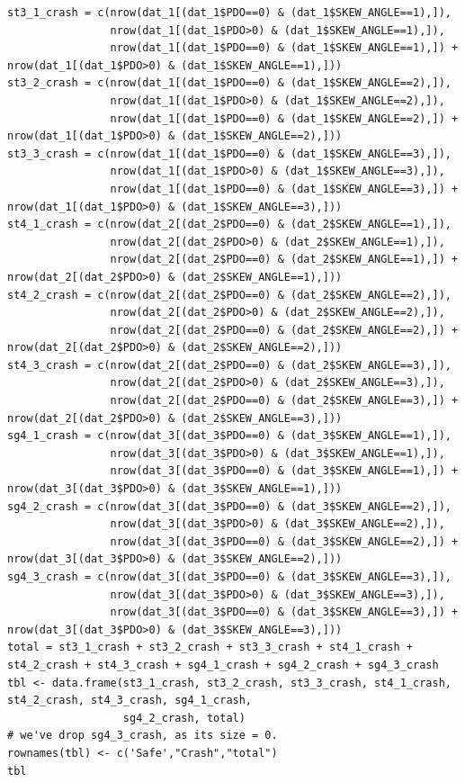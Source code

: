 \documentclass[11pt]{scrartcl} %
\begin{document}
\begin{lstlisting}
st3_1_crash = c(nrow(dat_1[(dat_1$PDO==0) & (dat_1$SKEW_ANGLE==1),]),
                nrow(dat_1[(dat_1$PDO>0) & (dat_1$SKEW_ANGLE==1),]),
                nrow(dat_1[(dat_1$PDO==0) & (dat_1$SKEW_ANGLE==1),]) + nrow(dat_1[(dat_1$PDO>0) & (dat_1$SKEW_ANGLE==1),]))
st3_2_crash = c(nrow(dat_1[(dat_1$PDO==0) & (dat_1$SKEW_ANGLE==2),]),
                nrow(dat_1[(dat_1$PDO>0) & (dat_1$SKEW_ANGLE==2),]),
                nrow(dat_1[(dat_1$PDO==0) & (dat_1$SKEW_ANGLE==2),]) + nrow(dat_1[(dat_1$PDO>0) & (dat_1$SKEW_ANGLE==2),]))
st3_3_crash = c(nrow(dat_1[(dat_1$PDO==0) & (dat_1$SKEW_ANGLE==3),]),
                nrow(dat_1[(dat_1$PDO>0) & (dat_1$SKEW_ANGLE==3),]),
                nrow(dat_1[(dat_1$PDO==0) & (dat_1$SKEW_ANGLE==3),]) + nrow(dat_1[(dat_1$PDO>0) & (dat_1$SKEW_ANGLE==3),]))
st4_1_crash = c(nrow(dat_2[(dat_2$PDO==0) & (dat_2$SKEW_ANGLE==1),]),
                nrow(dat_2[(dat_2$PDO>0) & (dat_2$SKEW_ANGLE==1),]),
                nrow(dat_2[(dat_2$PDO==0) & (dat_2$SKEW_ANGLE==1),]) + nrow(dat_2[(dat_2$PDO>0) & (dat_2$SKEW_ANGLE==1),]))
st4_2_crash = c(nrow(dat_2[(dat_2$PDO==0) & (dat_2$SKEW_ANGLE==2),]),
                nrow(dat_2[(dat_2$PDO>0) & (dat_2$SKEW_ANGLE==2),]),
                nrow(dat_2[(dat_2$PDO==0) & (dat_2$SKEW_ANGLE==2),]) + nrow(dat_2[(dat_2$PDO>0) & (dat_2$SKEW_ANGLE==2),]))
st4_3_crash = c(nrow(dat_2[(dat_2$PDO==0) & (dat_2$SKEW_ANGLE==3),]),
                nrow(dat_2[(dat_2$PDO>0) & (dat_2$SKEW_ANGLE==3),]),
                nrow(dat_2[(dat_2$PDO==0) & (dat_2$SKEW_ANGLE==3),]) + nrow(dat_2[(dat_2$PDO>0) & (dat_2$SKEW_ANGLE==3),]))
sg4_1_crash = c(nrow(dat_3[(dat_3$PDO==0) & (dat_3$SKEW_ANGLE==1),]),
                nrow(dat_3[(dat_3$PDO>0) & (dat_3$SKEW_ANGLE==1),]),
                nrow(dat_3[(dat_3$PDO==0) & (dat_3$SKEW_ANGLE==1),]) + nrow(dat_3[(dat_3$PDO>0) & (dat_3$SKEW_ANGLE==1),]))
sg4_2_crash = c(nrow(dat_3[(dat_3$PDO==0) & (dat_3$SKEW_ANGLE==2),]),
                nrow(dat_3[(dat_3$PDO>0) & (dat_3$SKEW_ANGLE==2),]),
                nrow(dat_3[(dat_3$PDO==0) & (dat_3$SKEW_ANGLE==2),]) + nrow(dat_3[(dat_3$PDO>0) & (dat_3$SKEW_ANGLE==2),]))
sg4_3_crash = c(nrow(dat_3[(dat_3$PDO==0) & (dat_3$SKEW_ANGLE==3),]),
                nrow(dat_3[(dat_3$PDO>0) & (dat_3$SKEW_ANGLE==3),]),
                nrow(dat_3[(dat_3$PDO==0) & (dat_3$SKEW_ANGLE==3),]) + nrow(dat_3[(dat_3$PDO>0) & (dat_3$SKEW_ANGLE==3),]))
total = st3_1_crash + st3_2_crash + st3_3_crash + st4_1_crash + st4_2_crash + st4_3_crash + sg4_1_crash + sg4_2_crash + sg4_3_crash
tbl <- data.frame(st3_1_crash, st3_2_crash, st3_3_crash, st4_1_crash, st4_2_crash, st4_3_crash, sg4_1_crash,
                  sg4_2_crash, total)
# we've drop sg4_3_crash, as its size = 0.
rownames(tbl) <- c('Safe',"Crash","total")
tbl


\end{lstlisting}
\end{document}
